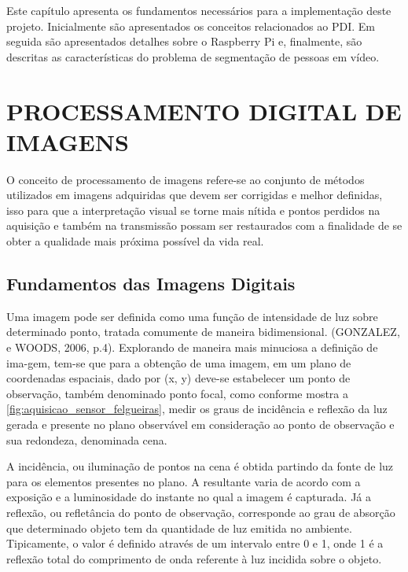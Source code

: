 \documentclass[12pt,oneside,a4paper,chapter=TITLE,section=TITLE,sumario=tradicional]{abntex2}
\begin{document}
Este capítulo apresenta os fundamentos necessários para a implementação deste projeto. Inicialmente são apresentados os conceitos relacionados ao PDI. Em seguida são apresentados detalhes sobre o Raspberry Pi e, finalmente, são descritas as características do problema de segmentação de pessoas em vídeo.


\section{PROCESSAMENTO DIGITAL DE IMAGENS}

O conceito de processamento de imagens refere-se ao conjunto de métodos utilizados em imagens adquiridas que devem ser corrigidas e melhor definidas, isso para que a interpretação visual se torne mais nítida e pontos perdidos na aquisição e também na transmissão possam ser restaurados com a finalidade de se obter a qualidade mais próxima possível da vida real.

\subsection{Fundamentos das Imagens Digitais}

Uma imagem pode ser definida como uma função de intensidade de luz sobre determinado ponto, tratada comumente de maneira bidimensional. (GONZALEZ, e WOODS, 2006, p.4). Explorando de maneira mais minuciosa a definição de ima-gem, tem-se que para a obtenção de uma imagem, em um plano de coordenadas espaciais, dado por (x, y) deve-se estabelecer um ponto de observação, também denominado ponto focal, como conforme mostra a \autoref{fig:aquisicao_sensor_felgueiras}, medir os graus de incidência e reflexão da luz gerada e presente no plano observável em consideração ao ponto de observação e sua redondeza, denominada cena.

\newline A incidência, ou iluminação de pontos na cena é obtida partindo da fonte de luz para os elementos presentes no plano. A resultante varia de acordo com a exposição e a luminosidade do instante no qual a imagem é capturada. Já a reflexão, ou refletância do ponto de observação, corresponde ao grau de absorção que determinado objeto tem da quantidade de luz emitida no ambiente. Tipicamente, o valor é definido através de um intervalo entre 0 e 1, onde 1 é a reflexão total do comprimento de onda referente à luz incidida sobre o objeto.


\begin{figure}[htb]
\end{figure}
\end{document}

